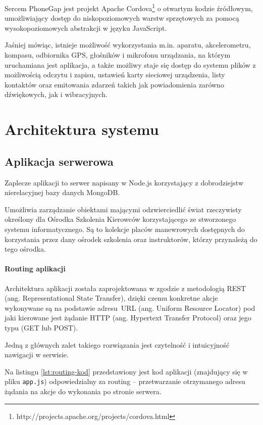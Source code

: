 \documentclass[twoside,a4paper,openright,12pt]{book}
\begin{document}
Sercem PhoneGap jest projekt Apache Cordova\footnote{http://projects.apache.org/projects/cordova.html} o otwartym kodzie źródłowym, umożliwiający dostęp do niskopoziomowych warstw sprzętowych za pomocą wysokopoziomowych abstrakcji w języku JavaScript. 

Jaśniej mówiąc, istnieje możliwość wykorzystania m.in. aparatu, akcelerometru, kompasu, odbiornika GPS, głośników i mikrofonu urządzania, na którym uruchamiana jest aplikacja, a także możliwy staje się dostęp do systemu plików z możliwością odczytu i zapisu, ustawień karty sieciowej urządzenia, listy kontaktów oraz emitowania zdarzeń takich jak powiadomienia zarówno dźwiękowych, jak i wibracyjnych.



\chapter{Architektura systemu}

\section{Aplikacja serwerowa}
Zaplecze aplikacji to serwer napisany w Node.js korzystający z dobrodziejstw nierelacyjnej bazy danych MongoDB.

Umożliwia zarządzanie obiektami mającymi odzwierciedlić świat rzeczywisty określony dla Ośrodka Szkolenia Kierowców korzystającego ze stworzonego systemu informatycznego. Są to kolekcje placów manewrowych dostępnych do korzystania przez dany ośrodek szkolenia oraz instruktorów, którzy przynależą do tego ośrodka.



\subsubsection{Routing aplikacji}

Architektura aplikacji została zaprojektowana w zgodzie z metodologią REST (ang. Representational State Transfer), dzięki czemu konkretne akcje wykonywane są na podstawie adresu~URL (ang. Uniform Resource Locator) pod jaki kierowane jest żądanie HTTP (ang. Hypertext Transfer Protocol) oraz jego typu (GET lub POST).

Jedną z głównych zalet takiego rozwiązania jest czytelność i intuicyjność nawigacji w serwisie.

Na listingu \ref{lst:routing-kod} przedstawiony jest kod aplikacji (znajdujący się w pliku \texttt{app.js}) odpowiedzialny za routing -- przetwarzanie otrzymanego adresu żądania na akcje do wykonania po stronie serwera. \\
\newpage
\end{document}
